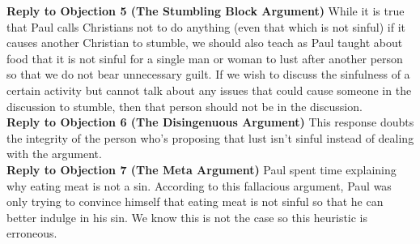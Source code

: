 \documentclass[a4paper, parskip=full, 12spt]{article}
\begin{document}
\textbf{Reply to Objection 5 (The Stumbling Block Argument)} While it is true that Paul calls Christians not to do anything (even that which is not sinful) if it causes another Christian to stumble, we should also teach as Paul taught about food that it is not sinful for a single man or woman to lust after another person so that we do not bear unnecessary guilt. If we wish to discuss the sinfulness of a certain activity but cannot talk about any issues that could cause someone in the discussion to stumble, then that person should not be in the discussion. \\
\textbf{Reply to Objection 6 (The Disingenuous Argument)} This response doubts the integrity of the person who's proposing that lust isn't sinful instead of dealing with the argument. \\
\textbf{Reply to Objection 7 (The Meta Argument)} Paul spent time explaining why eating meat is not a sin. According to this fallacious argument, Paul was only trying to convince himself that eating meat is not sinful so that he can better indulge in his sin. We know this is not the case so this heuristic is erroneous. \\
\end{document}

